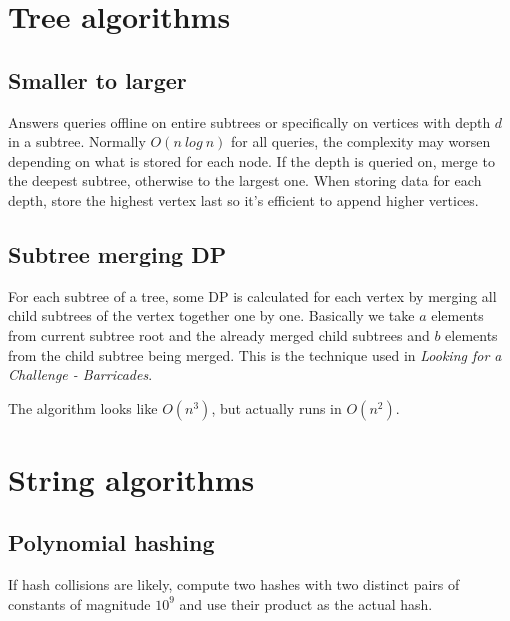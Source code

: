 \documentclass{article}
\begin{document}
\section {Tree algorithms}

\subsection {Smaller to larger}

Answers queries offline on entire subtrees or specifically on vertices with depth $d$ in a subtree. Normally $O(n\ log\ n)$ for all queries, the complexity may worsen depending on what is stored for each node. If the depth is queried on, merge to the deepest subtree, otherwise to the largest one. When storing data for each depth, store the highest vertex last so it's efficient to append higher vertices.



\subsection {Subtree merging DP}

For each subtree of a tree, some DP is calculated for each vertex by merging all child subtrees of the vertex together one by one. Basically we take $a$ elements from current subtree root and the already merged child subtrees and $b$ elements from the child subtree being merged. This is the technique used in \textit{Looking for a Challenge - Barricades}.

The algorithm looks like $O(n^3)$, but actually runs in $O(n^2)$.



\section {String algorithms}

\subsection {Polynomial hashing}

If hash collisions are likely, compute two hashes with two distinct pairs of constants of magnitude $10^9$ and use their product as the actual hash.


\end{document}
